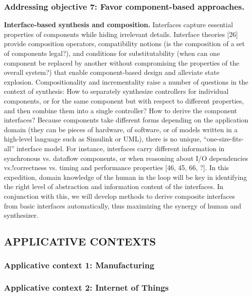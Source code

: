 \subsubsection{Addressing objective 7: Favor component-based approaches.}  



\textbf{Interface-based synthesis and composition.} Interfaces capture essential properties of components while hiding irrelevant details. Interface theories [26] provide composition operators, compatibility notions (is the composition of a set of components legal?), and conditions for substitutability (when can one component be replaced by another without compromising the properties of the overall system?) that enable component-based design and alleviate state explosion. Compositionality and incrementality raise a number of questions in the context of synthesis: How to separately synthesize controllers for individual components, or for the same component but with respect to different properties, and then combine them into a single controller? How to derive the component interfaces? Because components take different forms depending on the application domain (they can be pieces of hardware, of software, or of models written in a high-level language such as Simulink or UML), there is no unique, “one-size-fits-all” interface model. For instance, interfaces carry different information in synchronous vs. dataflow components, or when reasoning about I/O dependencies vs.!correctness vs. timing and performance properties [46, 45, 66, ?]. In this expedition, domain knowledge of the human in the loop will be key in identifying the right level of abstraction and information content of the interfaces. In conjunction with this, we will develop methods to derive composite interfaces from basic interfaces automatically, thus maximizing the synergy of human and synthesizer.

\subsection{APPLICATIVE CONTEXTS}

\subsubsection{Applicative context 1: Manufacturing}

\subsubsection{Applicative context 2: Internet of Things}

